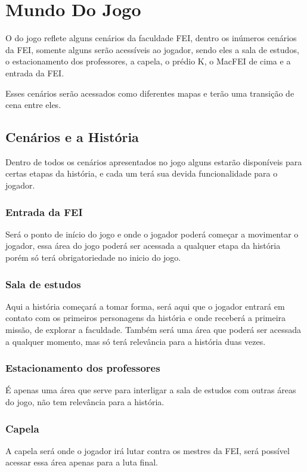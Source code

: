 \documentclass[a4paper,12pt]{article}
\begin{document}
\newpage
\section{Mundo Do Jogo}
O do jogo reflete alguns cenários da faculdade FEI, dentro os inúmeros cenários da FEI, somente alguns serão acessíveis ao
jogador, sendo eles a sala de estudos, o estacionamento dos professores, a capela, o prédio K, o MacFEI de cima e a entrada da FEI.

Esses cenários serão acessados como diferentes mapas e terão uma transição de cena entre eles.
\subsection{Cenários e a História}
Dentro de todos os cenários apresentados no jogo alguns estarão disponíveis para certas etapas da história, e cada um terá sua
devida funcionalidade para o jogador.

\subsubsection{Entrada da FEI}
Será o ponto de início do jogo e onde o jogador poderá começar a movimentar o jogador, essa área do jogo poderá ser acessada a qualquer etapa da história
porém só terá obrigatoriedade no inicio do jogo.

\subsubsection{Sala de estudos}
Aqui a história começará a tomar forma, será aqui que o jogador entrará em contato com os primeiros personagens da história e onde receberá a primeira missão,
de explorar a faculdade. Também será uma área que poderá ser acessada a qualquer momento, mas só terá relevância para a história duas vezes.

\subsubsection{Estacionamento dos professores}
É apenas uma área que serve para interligar a sala de estudos com outras áreas do jogo, não tem relevância para a história.

\subsubsection{Capela}
A capela será onde o jogador irá lutar contra os mestres da FEI, será possível acessar essa área apenas para a luta final.
\end{document}
